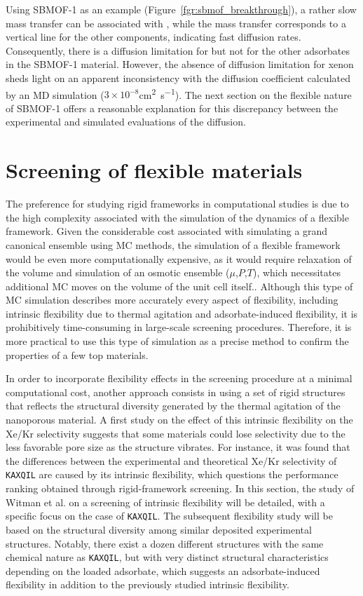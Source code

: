 \documentclass[main]{subfiles}
\begin{document}
Using SBMOF-1 as an example (Figure~\ref{fgr:sbmof_breakthrough}), a rather slow mass transfer can be associated with , while the mass transfer corresponds to a vertical line for the other components, indicating fast diffusion rates. Consequently, there is a diffusion limitation for  but not for the other adsorbates in the SBMOF-1 material. However, the absence of diffusion limitation for xenon sheds light on an apparent inconsistency with the diffusion coefficient calculated by an MD simulation ($3\times 10^{-8}$\si{\square\cm\per\s}). The next section on the flexible nature of SBMOF-1 offers a reasonable explanation for this discrepancy between the experimental and simulated evaluations of the diffusion.

\section{Screening of flexible materials}

The preference for studying rigid frameworks in computational studies is due to the high complexity associated with the simulation of the dynamics of a flexible framework. Given the considerable cost associated with simulating a grand canonical ensemble using MC methods, the simulation of a flexible framework would be even more computationally expensive, as it would require relaxation of the volume and simulation of an osmotic ensemble ($\mu$,$P$,$T$), which necessitates additional MC moves on the volume of the unit cell itself.\autocite{Bousquet2012}. Although this type of MC simulation describes more accurately every aspect of flexibility, including intrinsic flexibility due to thermal agitation and adsorbate-induced flexibility, it is prohibitively time-consuming in large-scale screening procedures. Therefore, it is more practical to use this type of simulation as a precise method to confirm the properties of a few top materials.

In order to incorporate flexibility effects in the screening procedure at a minimal computational cost, another approach consists in using a set of rigid structures that reflects the structural diversity generated by the thermal agitation of the nanoporous material. A first study on the effect of this intrinsic flexibility on the Xe/Kr selectivity suggests that some materials could lose selectivity due to the less favorable pore size as the structure vibrates.\autocite{Witman_2017} For instance, it was found that the differences between the experimental and theoretical Xe/Kr selectivity of \texttt{KAXQIL}\autocite{KAXQIL} are caused by its intrinsic flexibility, which questions the performance ranking obtained through rigid-framework screening. In this section, the study of Witman et al.\autocite{Witman_2017} on a screening of intrinsic flexibility will be detailed, with a specific focus on the case of \texttt{KAXQIL}. The subsequent flexibility study will be based on the structural diversity among similar deposited experimental structures. Notably, there exist a dozen different structures with the same chemical nature as \texttt{KAXQIL}, but with very distinct structural characteristics depending on the loaded adsorbate, which suggests an adsorbate-induced flexibility in addition to the previously studied intrinsic flexibility. 
\end{document}

